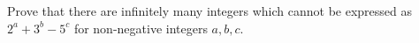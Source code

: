 Prove that there are infinitely many integers which cannot be expressed as $2^a+3^b-5^c$ for non-negative integers $a,b,c$.